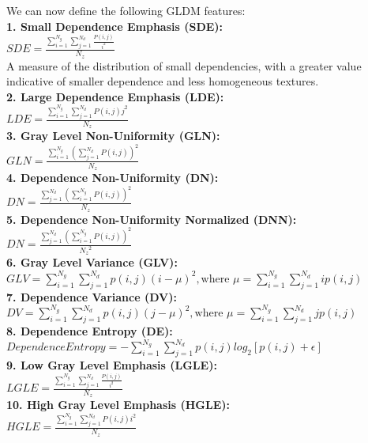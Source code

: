 We can now define the following GLDM features:\\

\textbf{1. Small Dependence Emphasis (SDE):}\\
$SDE=\frac{\sum _{i=1}^{N_{g}}\sum _{j=1}^{N_{d}}\frac{P\left(i,j\right)}{i^{2}}}{N_{z}}$\\
A measure of the distribution of small dependencies, with a greater value indicative of smaller dependence and less homogeneous textures.\\
\textbf{2. Large Dependence Emphasis (LDE):}\\
$LDE=\frac{\sum _{i=1}^{N_{g}}\sum _{j=1}^{N_{d}}P\left(i,j\right)j^{2}}{N_{z}}$\\
\textbf{3. Gray Level Non-Uniformity (GLN):}\\
$GLN=\frac{\sum _{i=1}^{N_{g}}\left(\sum _{j=1}^{N_{d}}P\left(i,j\right)\right)^{2}}{N_{z}}$\\
\textbf{4. Dependence Non-Uniformity (DN):}\\
$DN=\frac{\sum _{j=1}^{N_{d}}\left(\sum _{i=1}^{N_{g}}P\left(i,j\right)\right)^{2}}{N_{z}}$\\
\textbf{5. Dependence Non-Uniformity Normalized (DNN):}\\
$DN=\frac{\sum _{j=1}^{N_{d}}\left(\sum _{i=1}^{N_{g}}P\left(i,j\right)\right)^{2}}{{N_{z}}^{2}}$\\
\textbf{6. Gray Level Variance (GLV):}\\
$GLV=\sum _{i=1}^{N_{g}}\sum _{j=1}^{N_{d}}p\left(i,j\right)\left(i-\mu \right)^{2},\text{where } \mu =\sum _{i=1}^{N_{g}}\sum _{j=1}^{N_{d}}ip\left(i,j\right)$\\
\textbf{7. Dependence Variance (DV):}\\
$DV=\sum _{i=1}^{N_{g}}\sum _{j=1}^{N_{d}}p\left(i,j\right)\left(j-\mu \right)^{2},\text{where } \mu =\sum _{i=1}^{N_{g}}\sum _{j=1}^{N_{d}}jp\left(i,j\right)$\\
\textbf{8. Dependence Entropy (DE):}\\
$\textit{DependenceEntropy}=-\sum _{i=1}^{N_{g}}\sum _{j=1}^{N_{d}}p\left(i,j\right)log_{2}\left[p\left(i,j\right)+\epsilon \right]$\\
\textbf{9. Low Gray Level Emphasis (LGLE):}\\
$LGLE=\frac{\sum _{i=1}^{N_{g}}\sum _{j=1}^{N_{d}}\frac{P\left(i,j\right)}{i^{2}}}{N_{z}}$\\
\textbf{10. High Gray Level Emphasis (HGLE):}\\
$HGLE=\frac{\sum _{i=1}^{N_{g}}\sum _{j=1}^{N_{d}}P\left(i,j\right)i^{2}}{N_{z}}$\\
